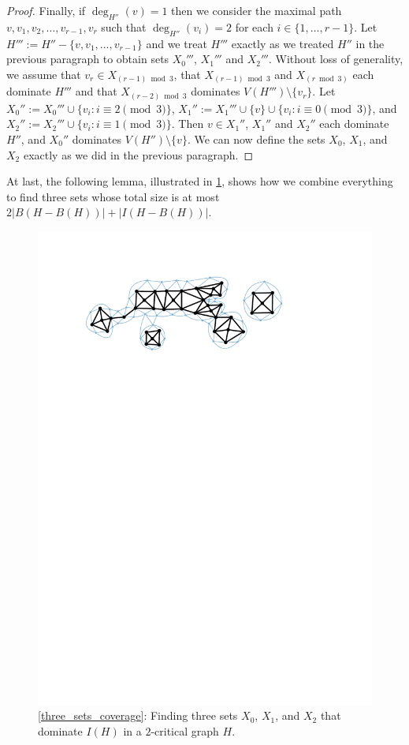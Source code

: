 \documentclass{article}
\theoremstyle{definition}
\begin{document}
\begin{proof}
  Finally, if $\deg_{H''}(v)=1$ then we consider the maximal path $v,v_1,v_2,\ldots,v_{r-1},v_r$ such that $\deg_{H''}(v_i)=2$ for each $i\in\{1,\ldots,r-1\}$.  Let $H''':=H''-\{v,v_1,\ldots,v_{r-1}\}$ and we treat $H'''$ exactly as we treated $H''$ in the previous paragraph to obtain sets $X_0'''$, $X_1'''$ and $X_2'''$.  Without loss of generality, we assume that $v_r\in X_{(r-1)\bmod 3}$, that $X_{(r-1)\bmod 3}$ and $X_{(r\bmod 3)}$ each dominate $H'''$ and that $X_{(r-2)\bmod 3}$ dominates  $V(H''')\setminus\{v_r\}$. Let $X_0'':=X_0'''\cup\{v_i:i\equiv 2\pmod 3\}$, $X_1'':=X_1'''\cup\{v\}\cup\{v_i:i\equiv 0\pmod 3\}$, and  $X_2'':=X_2'''\cup\{v_i:i\equiv 1\pmod 3\}$.  Then $v\in X_1''$, $X_1''$ and $X_2''$ each dominate $H''$, and $X_0''$ dominates $V(H'')\setminus\{v\}$.  We can now define the sets $X_0$, $X_1$, and $X_2$ exactly as we did in the previous paragraph.
\end{proof}


At last, the following lemma, illustrated in \cref{two_critical_colouring}, shows how we combine everything to find three sets whose total size is at most $2|B(H-B(H))| + |I(H-B(H))|$.

\begin{figure}
  \centering
  \includegraphics[page=4]{figs/two_critical}
  \caption{\cref{three_sets_coverage}: Finding three sets $X_0$, $X_1$, and $X_2$ that dominate $I(H)$ in a $2$-critical graph $H$.}
  \label{two_critical_colouring}
\end{figure}
\end{document}
